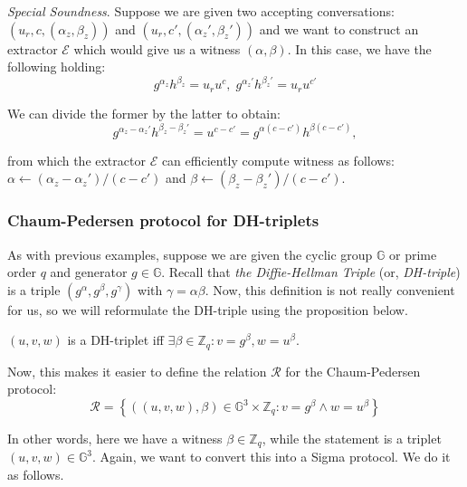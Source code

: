 \documentclass[../lecture-notes-105x135.tex]{subfiles}
\begin{document}
\textit{Special Soundness}. Suppose we are given two accepting conversations: $(u_r,c,(\alpha_z,\beta_z))$ and $(u_r,c',(\alpha_z',\beta_z'))$ and we want to construct an extractor $\mathcal{E}$ which would give us a witness $(\alpha,\beta)$. In this case, we have the following holding:
\begin{equation*}
    g^{\alpha_z}h^{\beta_z} = u_r u^c, \; g^{\alpha_z'}h^{\beta_z'} = u_r u^{c'}
\end{equation*}

We can divide the former by the latter to obtain:
\begin{equation*}
    g^{\alpha_z - \alpha_z'}h^{\beta_z - \beta_z'} = u^{c-c'} = g^{\alpha(c-c')}h^{\beta(c-c')},
\end{equation*}

from which the extractor $\mathcal{E}$ can efficiently compute witness as follows: $\alpha \gets (\alpha_z - \alpha_z')\big/(c-c')$ and $\beta \gets (\beta_z - \beta_z')\big/(c-c')$.

\subsubsection{Chaum-Pedersen protocol for DH-triplets}

As with previous examples, suppose we are given the cyclic group $\mathbb{G}$ or prime order $q$ and generator $g \in \mathbb{G}$. Recall that \textit{the Diffie-Hellman Triple} (or, \textit{DH-triple}) is a triple $(g^{\alpha},g^{\beta},g^{\gamma})$ with $\gamma=\alpha\beta$. Now, this definition is not really convenient for us, so we will reformulate the DH-triple using the proposition below.

\begin{proposition}
    $(u,v,w)$ is a DH-triplet iff $\exists \beta \in \mathbb{Z}_q: v = g^{\beta}, w = u^{\beta}$.
\end{proposition}

Now, this makes it easier to define the relation $\mathcal{R}$ for the Chaum-Pedersen protocol:
\vspace{-2mm}
\begin{equation*}
    \mathcal{R} = \left\{ ((u,v,w), \beta) \in \mathbb{G}^3 \times \mathbb{Z}_q: v = g^{\beta} \wedge w = u^{\beta} \right\}
\end{equation*}
\vspace{-4mm}

In other words, here we have a witness $\beta \in \mathbb{Z}_q$, while the statement is a triplet $(u,v,w) \in \mathbb{G}^3$. Again, we want to convert this into a Sigma protocol. We do it as follows.
\end{document}
